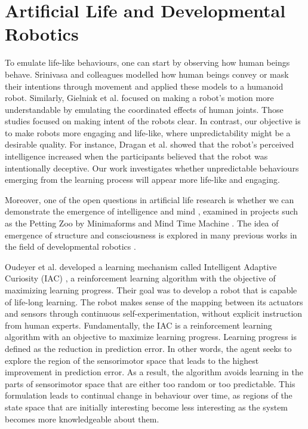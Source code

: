 \section{Artificial Life and Developmental Robotics}

To emulate life-like behaviours, one can start by observing how human beings behave. Srinivasa and colleagues \cite{Dragan2015}\cite{AncaDraga2014} modelled how human beings convey or mask their intentions through movement and applied these models to a humanoid robot. Similarly, Gielniak et al. \cite{Gielniak2013} focused on making a robot's motion more understandable by emulating the coordinated effects of human joints. Those studies focused on making intent of the robots clear. In contrast, our objective is to make robots more engaging and life-like, where unpredictability might be a desirable quality. For instance, Dragan et al. \cite{AncaDraga2014} showed that the robot's perceived intelligence increased when the participants believed that the robot was intentionally deceptive. Our work investigates whether unpredictable behaviours emerging from the learning process will appear more life-like and engaging.

Moreover, one of the open questions in artificial life research is whether we can demonstrate the emergence of intelligence and mind \cite{Bedau2000}, examined in projects such as the Petting Zoo by Minimaforms \cite{Minimaforms} and Mind Time Machine \cite{Ikegami2013}. The idea of emergence of structure and consciousness is explored in many previous works in the field of developmental robotics \cite{Lungarella2003}\cite{Asada2009}\cite{Kompella2014}. %

Oudeyer et al. developed a learning mechanism called Intelligent Adaptive Curiosity (IAC) \cite{Oudeyer2007}, a reinforcement learning algorithm with the objective of maximizing learning progress. Their goal 
was to develop a robot that is capable of life-long learning. The robot makes sense of the mapping between its actuators and sensors through continuous self-experimentation, without explicit instruction from human experts. Fundamentally, the IAC is a reinforcement learning algorithm with an objective to maximize learning progress. Learning progress is defined as the reduction in prediction error. In other words, the agent seeks to explore the region of the sensorimotor space that leads to the highest improvement in prediction error. As a result, the algorithm avoids learning in the parts of sensorimotor space that are either too random or too predictable. This formulation leads to continual change in behaviour over time, as regions of the state space that are initially interesting become less interesting as the system becomes more knowledgeable about them. 

